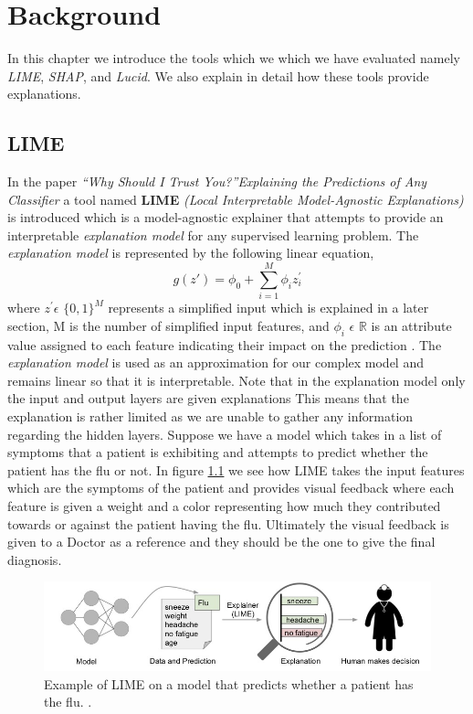 
\chapter{Background} \label{sect-background}
In this chapter we introduce the  tools which we which we have evaluated namely \emph{LIME}, \emph{SHAP}, and \emph{Lucid}. We also explain in detail how these tools provide explanations.
\section{LIME}
In the paper \emph{“Why Should I Trust You?”Explaining the Predictions of Any Classifier} \cite{lime} a tool named \textbf{LIME} \emph{(Local Interpretable Model-Agnostic Explanations)} is introduced which is a model-agnostic explainer that attempts to provide an interpretable \emph{explanation model} for any supervised learning problem. The \emph{explanation model} is represented by the following linear equation,
\begin{equation}
g(z') = \phi_0 + \sum\limits_{i=1}^M \phi_i z_{i}^{'}
\label{eq:lime-explanation}
\end{equation}
where $z^{'} \epsilon$ $\{0,1\}^{M}$ represents a simplified input which is explained in a later section, M is the number of simplified input features, and $\phi_{i}$ $\epsilon$ $\mathbb{R}$ is an attribute value assigned to each feature indicating their impact on the prediction \cite{NIPS2017_7062}.
The \emph{explanation model} is used as an approximation for our complex model and remains linear so that it is interpretable. Note that in the explanation model only the input and output layers are given explanations This means that the explanation is rather limited as we are unable to gather any information regarding the hidden layers. Suppose we have a model which takes in a list of symptoms that a patient is exhibiting and attempts to predict whether the patient has the flu or not. In figure \ref{fig:lime-process} we see how LIME takes the input features which are the symptoms of the patient and provides visual feedback where each feature is given a weight and a color representing how much they contributed towards or against the patient having the flu. Ultimately the visual feedback is given to a Doctor as a reference and they should be the one to give the final diagnosis.




\begin  {figure} [!htbp]
  \includegraphics[width=\linewidth]{Evaluation_Images/Lime_Process.jpg}
  \caption{Example of LIME on a model that predicts whether a patient has the flu. \cite{lime}.}
  \label{fig:lime-process}
\end{figure}


